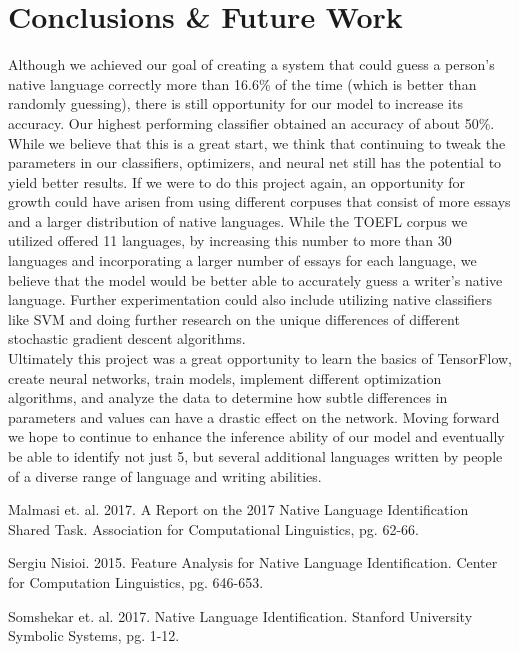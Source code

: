 \documentclass[12pt]{article}
\newcommand\tab[1][1cm]{\hspace*{#1}}
\begin{document}
\section{Conclusions \& Future Work}
\tab Although we achieved our goal of creating a system that could guess a person’s native language correctly more than 16.6\% of the time (which is better than randomly guessing), there is still opportunity for our model to increase its accuracy. Our highest performing classifier obtained an accuracy of about 50\%. While we believe that this is a great start, we think that continuing to tweak the parameters in our classifiers, optimizers, and neural net still has the potential to yield better results. If we were to do this project again, an opportunity for growth could have arisen from using different corpuses that consist of more essays and a larger distribution of native languages. While the TOEFL corpus we utilized offered 11 languages, by increasing this number to more than 30 languages and incorporating a larger number of essays for each language, we believe that the model would be better able to accurately guess a writer’s native language. Further experimentation could also include utilizing native classifiers like SVM and doing further research on the unique differences of different stochastic gradient descent algorithms.\\
\tab Ultimately this project was a great opportunity to learn the basics of TensorFlow, create neural networks, train models, implement different optimization algorithms, and analyze the data to determine how subtle differences in parameters and values can have a drastic effect on the network. Moving forward we hope to continue to enhance the inference ability of our model and eventually be able to identify not just 5, but several additional languages written by people of a diverse range of language and writing abilities.
\begin{thebibliography}{9}
	Malmasi et. al. 2017. A Report on the 2017 Native Language Identiﬁcation Shared Task. Association for Computational Linguistics, pg. 62-66.
	
	Sergiu Nisioi. 2015. Feature Analysis for Native Language Identiﬁcation. Center for Computation Linguistics, pg. 646-653.
	
	Somshekar et. al. 2017. Native Language Identification. Stanford University Symbolic Systems, pg. 1-12.
\end{thebibliography}
\end{document}
